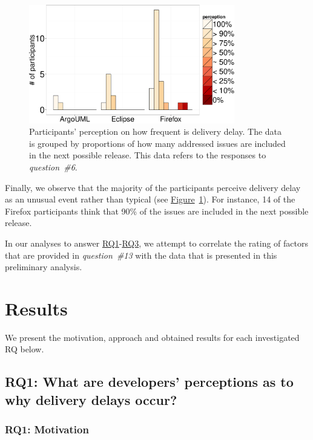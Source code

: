 \begin{figure}
	\centering
	\includegraphics[width=0.80\textwidth,keepaspectratio] 
	{chapters/chapter5/figures/delay_perception.pdf}
	\caption{Participants' perception on how frequent is delivery delay. The data is grouped by proportions of
		how many addressed issues are included in the next possible
		release. This data refers to the responses to {\em question~\#6}.}
	\label{fig:delay_perception}
\end{figure}
Finally, we observe that the majority of the participants perceive delivery
delay as an unusual event rather than typical (see
\hyperref[fig:delay_perception]{Figure}~\ref{fig:delay_perception}). For
instance, 14 of the Firefox participants think that 90\% of the issues are
included in the next possible release.

In our analyses to answer \hyperref[ch5:rq1]{RQ1}-\hyperref[ch5:rq3]{RQ3}, we
attempt to correlate the rating of factors that are provided in {\em
question~\#13} with the data that is presented in this preliminary analysis.

\section{Results} \label{ch6:results}

We present the motivation, approach and obtained results for each investigated
RQ below.

\subsection{RQ1: What are developers' perceptions as to why delivery delays
occur?}\label{ch5:rq1}

\subsubsection*{RQ1: Motivation}

